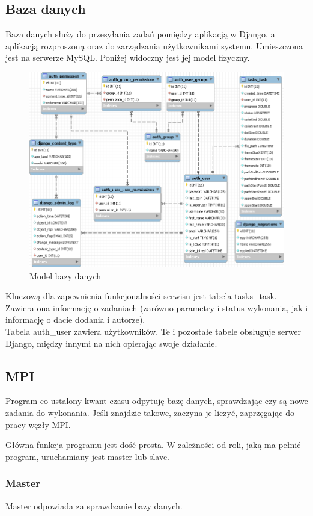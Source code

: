 \documentclass[a4paper]{article}
\begin{document}
\subsection{Baza danych}
Baza danych służy do przesyłania zadań pomiędzy aplikacją w Django, a aplikacją rozproszoną oraz do zarządzania użytkownikami systemu. Umieszczona jest na serwerze MySQL. Poniżej widoczny jest jej model fizyczny.
 \begin{figure}[H]
    \centering
    \includegraphics[width=\textwidth]{sql.png}
    \caption{Model bazy danych}
    \label{fig:db}
\end{figure}

Kluczową dla zapewnienia funkcjonalności serwisu jest tabela tasks\_task. Zawiera ona informację o zadaniach (zarówno parametry i status wykonania, jak i informację o dacie dodania i autorze). \\
Tabela auth\_user zawiera użytkowników. Te i pozostałe tabele obsługuje serwer Django, między innymi na nich opierając swoje działanie.

\subsection{MPI}
Program co ustalony kwant czasu odpytuję bazę danych, sprawdzając czy są nowe zadania do wykonania. Jeśli znajdzie takowe, zaczyna je liczyć, zaprzęgając do pracy węzły MPI.

Główna funkcja programu jest dość prosta. W zależności od roli, jaką ma pełnić program, uruchamiany jest master lub slave.


\subsubsection{Master}
Master odpowiada za sprawdzanie bazy danych. 
\end{document}
